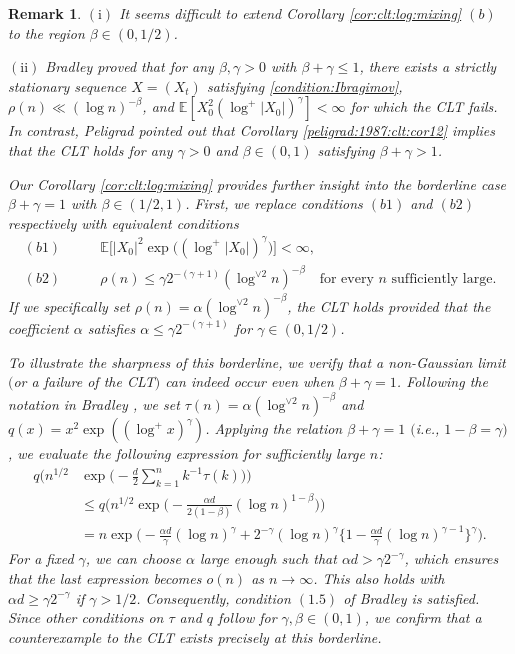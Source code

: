 \documentclass[11pt,a4,leqno]{amsart}
\newtheorem{remark}[lemma]{Remark}
\newcommand{\E }{{\mathbb E}}
\newcommand{\1}{{\mathbf 1}}
\begin{document}
\begin{remark}
\label{rem:log(n)^(-beta)}
\noindent $(\mathrm{i})$ It seems difficult to extend Corollary \ref{cor:clt:log:mixing} $(b)$ to the region $\beta \in (0, 1/2)$.

\vspace{2mm}
\noindent $(\mathrm{ii})$ Bradley \cite[Corollary 2]{bradley:1980} proved that for any $\beta, \gamma > 0$ with $\beta + \gamma \le 1$, there exists a strictly stationary sequence $X=(X_t)$ satisfying \eqref{condition:Ibragimov}, $\rho(n) \ll (\log n)^{-\beta}$, and $\E[ X_0^2 (\log^+ |X_0|)^\gamma ] < \infty$ for which the CLT fails. In contrast, Peligrad \cite{peligrad:1987} pointed out that Corollary \ref{peligrad:1987:clt:cor12} implies that 
the CLT holds for any $\gamma > 0$ and $\beta \in (0,1)$ satisfying $\beta + \gamma > 1$.

Our Corollary \ref{cor:clt:log:mixing} provides further insight into the borderline case $\beta + \gamma = 1$ with $\beta \in (1/2, 1)$. First, we replace conditions $(b1)$ and $(b2)$ respectively with equivalent conditions 
\begin{align*}
(b1)\qquad & \E\Big[ |X_0|^2 \exp\Big( (\log^+ |X_0|)^\gamma \Big) \Big] < \infty, \\
(b2)\qquad & \rho(n) \le \gamma 2^{-(\gamma+1)} (\log^{\vee 2} n)^{-\beta}\quad \text{for every $n$ sufficiently large}.
\end{align*}
If we specifically set $\rho(n) = \alpha (\log^{\vee 2} n)^{-\beta}$, the CLT holds provided that the coefficient $\alpha$ satisfies $\alpha \le \gamma 2^{-(\gamma+1)}$ for $\gamma \in (0, 1/2)$. 

To illustrate the sharpness of this borderline, we verify that a non-Gaussian limit $($or a failure of the CLT$)$ can indeed occur even when $\beta + \gamma = 1$. Following the notation in Bradley \cite[Theorem 1]{bradley:1980}, we set $\tau(n) = \alpha (\log^{\vee 2} n)^{-\beta}$ and $q(x) = x^2 \exp((\log^+ x)^\gamma)$. Applying the relation $\beta + \gamma = 1$ $($i.e., $1 - \beta = \gamma$$)$, we evaluate the following expression for sufficiently large $n$:
\begin{align*}
q\Big( n^{1/2} &\exp\Big( -\frac{d}{2} \sum_{k=1}^n k^{-1} \tau(k) \Big) \Big) \\
&\le q\Big( n^{1/2} \exp\Big( -\frac{\alpha d}{2(1-\beta)} (\log n)^{1-\beta} \Big) \Big) \\
&= n \exp\Big( -\frac{\alpha d}{\gamma} (\log n)^\gamma + 2^{-\gamma} (\log n)^\gamma \Big\{ 1 - \frac{\alpha d}{\gamma} (\log n)^{\gamma-1} \Big\}^\gamma \Big).
\end{align*}
For a fixed $\gamma$, we can choose $\alpha$ large enough such that $\alpha d > \gamma 2^{-\gamma}$, 
which ensures that the last expression becomes $o(n)$ as $n \to \infty$. 
This also holds with $\alpha d \ge \gamma 2^{-\gamma}$ if $\gamma > 1/2$. 
Consequently, condition $(1.5)$ of Bradley \cite[Theorem 1]{bradley:1980} 
is satisfied. Since other conditions on $\tau$ and $q$ follow for $\gamma, \beta \in (0,1)$, 
we confirm that a counterexample to the CLT exists precisely at this borderline. 


\end{remark}
\end{document}

